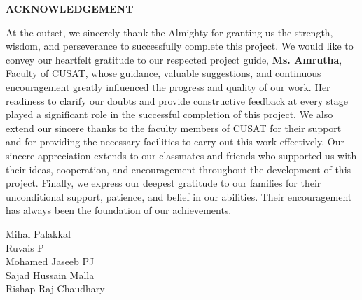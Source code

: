 \clearpage
{}
{}
\thispagestyle{footeronly}

\begin{center}
{\Large \textbf{ACKNOWLEDGEMENT}}
\end{center}

\justifying
\noindent
At the outset, we sincerely thank the Almighty for granting us the strength, wisdom, and perseverance
to successfully complete this project. We would like to convey our heartfelt gratitude to our respected
project guide, \textbf{Ms. Amrutha}, Faculty of CUSAT, whose guidance, valuable suggestions, and continuous
encouragement greatly influenced the progress and quality of our work. Her readiness to clarify our doubts
and provide constructive feedback at every stage played a significant role in the successful completion
of this project. We also extend our sincere thanks to the faculty members of CUSAT for their support and for 
providing the necessary facilities to carry out this work effectively. Our sincere appreciation extends to our 
classmates and friends who supported us with their ideas, cooperation, and encouragement throughout the development
 of this project. Finally, we express our deepest gratitude to our families for their unconditional support, patience,
  and belief in our abilities. Their encouragement has always been the foundation of our achievements.

\vspace{1.5cm}
\noindent
Mihal Palakkal\\
Ruvais P\\
Mohamed Jaseeb PJ\\
Sajad Hussain Malla\\
Rishap Raj Chaudhary

\vfill
\clearpage
